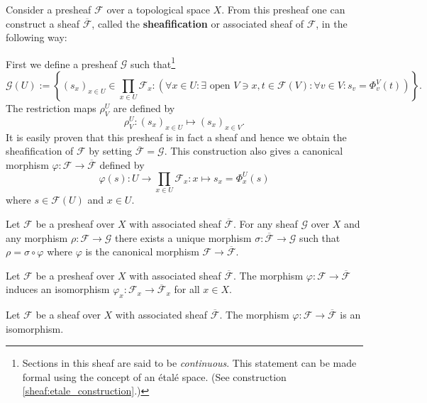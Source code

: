     \begin{construct}
        Consider a presheaf $\mathcal{F}$ over a topological space $X$. From this presheaf one can construct a sheaf $\overline{\mathcal{F}}$, called the \textbf{sheafification} or associated sheaf of $\mathcal{F}$, in the following way:

        First we define a presheaf $\mathcal{G}$ such that\footnote{Sections in this sheaf are said to be \textit{continuous}. This statement can be made formal using the concept of an \'etal\'e space. (See construction \ref{sheaf:etale_construction}.)}
        \begin{equation}
            \mathcal{G}(U) := \left\{(s_x)_{x\in U}\in\prod_{x\in U}\mathcal{F}_x:\left(\forall x\in U: \exists\text{ open }V\ni x, t\in\mathcal{F}(V): \forall v\in V: s_v = \Phi^V_v(t)\right)\right\}.
        \end{equation}
        The restriction maps $\rho^U_V$ are defined by
        \begin{equation}
            \rho^U_V:(s_x)_{x\in U}\mapsto(s_x)_{x\in V}.
        \end{equation}
        It is easily proven that this presheaf is in fact a sheaf and hence we obtain the sheafification of $\mathcal{F}$ by setting $\overline{\mathcal{F}} = \mathcal{G}$. This construction also gives a canonical morphism $\varphi:\mathcal{F}\rightarrow\overline{\mathcal{F}}$ defined by
        \begin{equation}
            \varphi(s):U\rightarrow\prod_{x\in U}\mathcal{F}_x:x \mapsto s_x = \Phi^U_x(s)
        \end{equation}
        where $s\in\mathcal{F}(U)$ and $x\in U$.
    \end{construct}

    \begin{uproperty}
        Let $\mathcal{F}$ be a presheaf over $X$ with associated sheaf $\overline{\mathcal{F}}$. For any sheaf $\mathcal{G}$ over $X$ and any morphism $\rho:\mathcal{F}\rightarrow\mathcal{G}$ there exists a unique morphism $\sigma:\overline{\mathcal{F}}\rightarrow\mathcal{G}$ such that $\rho = \sigma\circ\varphi$ where $\varphi$ is the canonical morphism $\mathcal{F}\rightarrow\overline{\mathcal{F}}$.
    \end{uproperty}

    \begin{property}
        Let $\mathcal{F}$ be a presheaf over $X$ with associated sheaf $\overline{\mathcal{F}}$. The morphism $\varphi:\mathcal{F}\rightarrow\overline{\mathcal{F}}$ induces an isomorphism $\varphi_x:\mathcal{F}_x\rightarrow\overline{\mathcal{F}}_x$ for all $x\in X$.
    \end{property}
    \begin{property}
        Let $\mathcal{F}$ be a sheaf over $X$ with associated sheaf $\overline{\mathcal{F}}$. The morphism $\varphi:\mathcal{F}\rightarrow\overline{\mathcal{F}}$ is an isomorphism.
    \end{property}

